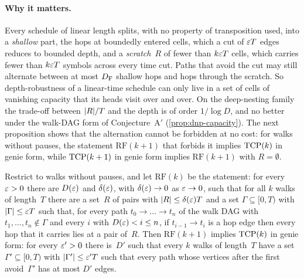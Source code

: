 \paragraph{Why it matters.} Every schedule of linear length splits, with no property of transposition used, into a
\emph{shallow} part, the hops at boundedly entered cells, which a cut of $\varepsilon T$ edges reduces to bounded depth, and a
\emph{scratch}~$R$ of fewer than $k\varepsilon T$ cells, which carries fewer than $k\varepsilon T$ symbols across every time cut.
Paths that avoid the cut may still alternate between at most $D_{\mathrm F}$ shallow hops and hops through the scratch. So
depth-robustness of a linear-time schedule can only live in a set of cells of vanishing capacity that its heads visit
over and over. On the deep-nesting family the trade-off between $\lvert R \rvert/T$ and the depth is of order $1/\log D$, and no
better under the walk-DAG form of Conjecture~A$'$ (\cref{prop:dnp-capacity}). The next proposition shows that the
alternation cannot be forbidden at no cost: for walks without pauses, the statement $\mathrm{RF}(k+1)$ that forbids it
implies $\mathrm{TCP}(k)$ in genie form, while $\mathrm{TCP}(k+1)$ in genie form implies $\mathrm{RF}(k+1)$ with $R=\emptyset$.

\begin{proposition}\label{prop:relays}
Restrict to walks without pauses, and let $\mathrm{RF}(k)$ be the statement: for every $\varepsilon>0$ there are $D(\varepsilon)$ and
$\delta(\varepsilon)$, with $\delta(\varepsilon)\to0$ as $\varepsilon\to0$, such that for all $k$ walks of length~$T$ there are a set~$R$ of pairs
with $\lvert R \rvert\le\delta(\varepsilon)T$ and a set $\Gamma\subseteq[0,T)$ with $\lvert \Gamma \rvert\le\varepsilon T$ such that, for every path
$t_0\to\dots\to t_n$ of the walk DAG with $t_1,\dots,t_n\notin\Gamma$ and every $i$ with $D(\varepsilon)<i\le n$, if
$t_{i-1}\to t_i$ is a hop edge then every hop that it carries lies at a pair of~$R$. Then $\mathrm{RF}(k+1)$ implies
$\mathrm{TCP}(k)$ in genie form: for every $\varepsilon'>0$ there is~$D'$ such that every $k$ walks of length~$T$ have a set
$\Gamma'\subseteq[0,T)$ with $\lvert \Gamma' \rvert\le\varepsilon'T$ such that every path whose vertices after the first avoid~$\Gamma'$
has at most $D'$ edges.
\end{proposition}

